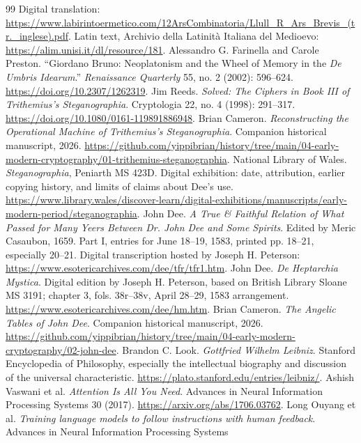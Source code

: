\documentclass[11pt]{article}
\begin{document}
\begin{thebibliography}{99}
Digital translation:
\url{https://www.labirintoermetico.com/12ArsCombinatoria/Llull_R_Ars_Brevis_(tr._inglese).pdf}.
Latin text, Archivio della Latinit\`a Italiana del Medioevo:
\url{https://alim.unisi.it/dl/resource/181}.
Alessandro G. Farinella and Carole Preston.
``Giordano Bruno: Neoplatonism and the Wheel of Memory in the
\emph{De Umbris Idearum}.''
\emph{Renaissance Quarterly} 55, no. 2 (2002): 596--624.
\url{https://doi.org/10.2307/1262319}.
Jim Reeds. \emph{Solved: The Ciphers in Book III of Trithemius's Steganographia}.
Cryptologia 22, no. 4 (1998): 291--317.
\url{https://doi.org/10.1080/0161-119891886948}.
Brian Cameron. \emph{Reconstructing the Operational Machine of Trithemius's
Steganographia}. Companion historical manuscript, 2026.
\url{https://github.com/yippibrian/history/tree/main/04-early-modern-cryptography/01-trithemius-steganographia}.
National Library of Wales. \emph{Steganographia}, Peniarth MS 423D.
Digital exhibition: date, attribution, earlier copying history, and limits
of claims about Dee's use.
\url{https://www.library.wales/discover-learn/digital-exhibitions/manuscripts/early-modern-period/steganographia}.
John Dee. \emph{A True \& Faithful Relation of What Passed for Many Yeers
Between Dr. John Dee and Some Spirits}. Edited by Meric Casaubon, 1659.
Part I, entries for June 18--19, 1583, printed pp. 18--21, especially 20--21.
Digital transcription hosted by Joseph H. Peterson:
\url{https://www.esotericarchives.com/dee/tfr/tfr1.htm}.
John Dee. \emph{De Heptarchia Mystica}. Digital edition by Joseph H. Peterson,
based on British Library Sloane MS 3191; chapter 3, fols. 38r--38v,
April 28--29, 1583 arrangement.
\url{https://www.esotericarchives.com/dee/hm.htm}.
Brian Cameron. \emph{The Angelic Tables of John Dee}.
Companion historical manuscript, 2026.
\url{https://github.com/yippibrian/history/tree/main/04-early-modern-cryptography/02-john-dee}.
Brandon C. Look. \emph{Gottfried Wilhelm Leibniz}.
Stanford Encyclopedia of Philosophy, especially the intellectual
biography and discussion of the universal characteristic.
\url{https://plato.stanford.edu/entries/leibniz/}.
Ashish Vaswani et al. \emph{Attention Is All You Need}.
Advances in Neural Information Processing Systems 30 (2017).
\url{https://arxiv.org/abs/1706.03762}.
Long Ouyang et al. \emph{Training language models to follow instructions with
human feedback}. Advances in Neural Information Processing Systems

\end{thebibliography}
\end{document}
